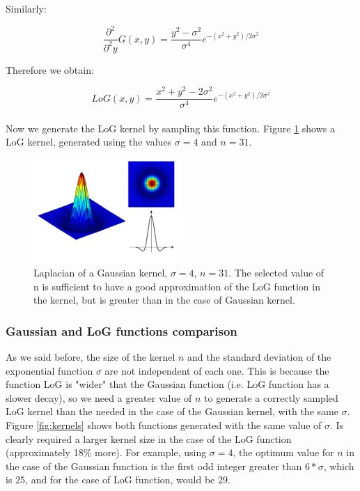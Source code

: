 \documentclass{ipol}
\numberwithin{equation}{section}
\numberwithin{table}{section}
\numberwithin{figure}{section}
\begin{document}
Similarly:

\begin{equation} 
	\frac{\partial^2}{\partial^2 y}G(x,y)=\frac{y^2-\sigma^2}{\sigma^4}e^{-(x^2+y^2)/2\sigma^2} 
\end{equation}

Therefore we obtain:

\begin{equation}
	\label{eq:log_function}
	LoG(x,y)=\frac{x^2+y^2-2\sigma^2}{\sigma^4}e^{-(x^2+y^2)/2\sigma^2}
\end{equation}\\

Now we generate the LoG kernel by sampling this function. Figure \ref{fig:log_kernel} shows a LoG kernel, generated using the 
values $\sigma=4$ and $n=31$.\\

\begin{figure}
	\centering
	\includegraphics[width=0.5\textwidth]{kernel_log.pdf}
	\caption{Laplacian of a Gaussian kernel, $\sigma=4$, $n=31$. The selected value of n is sufficient 
to have a good approximation of the LoG function in the kernel, but is greater than in the case of 
Gaussian kernel.}
	\label{fig:log_kernel}
\end{figure}

\subsubsection{Gaussian and LoG functions comparison}

As we said before, the size of the kernel $n$ and the standard deviation of the exponential function 
$\sigma$ are not independent of each one. This is because the function LoG is "wider" that the 
Gaussian function (i.e. LoG function has a slower decay), so we need a greater value of $n$ to 
generate a correctly sampled LoG kernel than the needed in the case of the Gaussian kernel, with the same $\sigma$.\\

Figure \ref{fig:kernels} shows both functions generated with the same value of $\sigma$. Is clearly 
required a larger kernel size in the case of the LoG function (approximately 18\% more). For 
example, using $\sigma=4$, the optimum value for $n$ in the case of the Gaussian function is the 
first odd integer greater than $6*\sigma$, which is $25$, and for the case of LoG function, would 
be $29$.\\
\end{document}

